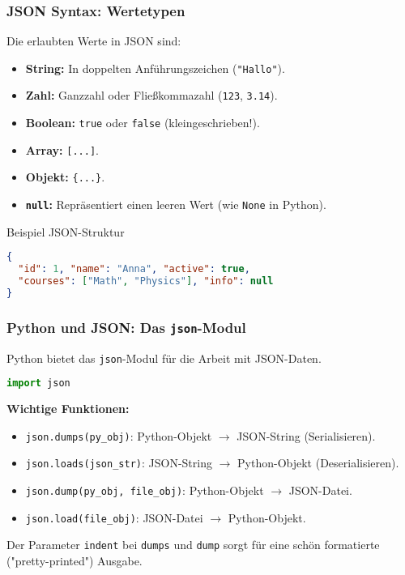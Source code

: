 \documentclass[aspectratio=169]{beamer} %
\begin{document}
\begin{frame}[fragile]
\frametitle{JSON Syntax: Wertetypen}
Die erlaubten Werte in JSON sind:
\begin{itemize}
    \item \textbf{String:} In doppelten Anführungszeichen (\texttt{"Hallo"}).
    \item \textbf{Zahl:} Ganzzahl oder Fließkommazahl (\texttt{123}, \texttt{3.14}).
    \item \textbf{Boolean:} \texttt{true} oder \texttt{false} (kleingeschrieben!).
    \item \textbf{Array:} \texttt{[...]}.
    \item \textbf{Objekt:} \texttt{\{...\}}.
    \item \textbf{\texttt{null}:} Repräsentiert einen leeren Wert (wie \texttt{None} in Python).
\end{itemize}
\begin{block}{Beispiel JSON-Struktur}
\begin{lstlisting}[language=json, basicstyle=\ttfamily\tiny]
{
  "id": 1, "name": "Anna", "active": true,
  "courses": ["Math", "Physics"], "info": null
}
\end{lstlisting}
\end{block}
\end{frame}

\begin{frame}[fragile]
\frametitle{Python und JSON: Das \texttt{json}-Modul}
Python bietet das \texttt{json}-Modul für die Arbeit mit JSON-Daten.
\begin{lstlisting}[language=Python]
import json
\end{lstlisting}
\textbf{Wichtige Funktionen:}
\begin{itemize}
    \item \texttt{json.dumps(py\_obj)}: Python-Objekt $\rightarrow$ JSON-String (Serialisieren).
    \item \texttt{json.loads(json\_str)}: JSON-String $\rightarrow$ Python-Objekt (Deserialisieren).
    \item \texttt{json.dump(py\_obj, file\_obj)}: Python-Objekt $\rightarrow$ JSON-Datei.
    \item \texttt{json.load(file\_obj)}: JSON-Datei $\rightarrow$ Python-Objekt.
\end{itemize}
Der Parameter \texttt{indent} bei \texttt{dumps} und \texttt{dump} sorgt für eine schön formatierte ("pretty-printed") Ausgabe.
\end{frame}
\end{document}
